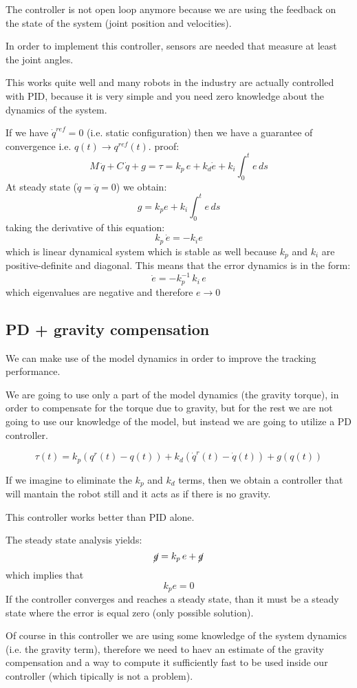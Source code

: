 The controller is not open loop anymore because we are using the feedback on the state of the system (joint position and velocities).

In order to implement this controller, sensors are needed that measure at least the joint angles.

This works quite well and many robots in the industry are actually controlled with PID, because it is very simple and you need zero knowledge about the dynamics of the system.

If we have $\dot{q}^{ref} = 0$ (i.e. static configuration) then we have a guarantee of convergence i.e. $q(t) \to q^{ref}(t)$.
proof:
\[M\,\ddot{q} + C\,\dot{q} + g = \tau = k_p \, e + k_d \dot{e} + k_i \int_0^t e\,ds\]
At steady state ($\dot{q} = \ddot{q} = 0$) we obtain:
\[g = k_p e + k_i \int_0^t e\,ds\]
taking the derivative of this equation:
\[k_p\,\dot{e} = -k_i e\]
which is linear dynamical system which is stable as well because $k_p$ and $k_i$ are positive-definite and diagonal. This means that the error dynamics is in the form:
\[\dot{e} = -k_p^{-1}\,k_i\,e\]
which eigenvalues are negative and therefore $e\to 0$

\subsection{PD + gravity compensation}
We can make use of the model dynamics in order to improve the tracking performance.

We are going to use only a part of the model dynamics (the gravity torque), in order to compensate for the torque due to gravity, but for the rest we are not going to use our knowledge of the model, but instead we are going to utilize a PD controller.

\[\tau(t) = k_p (q^r(t) - q(t))  + k_d (\dot{q}^r(t) - \dot{q}(t)) + g(q(t))\]

If we imagine to eliminate the $k_p$ and $k_d$ terms, then we obtain a controller that will mantain the robot still and it acts as if there is no gravity.

This controller works better than PID alone.

The steady state analysis yields:
\[\cancel{g} = k_p\,e + \cancel{g}\]
which implies that 
\[k_p e = 0\]
If the controller converges and reaches a steady state, than it must be a steady state where the error is equal zero (only possible solution).

Of course in this controller we are using some knowledge of the system dynamics (i.e. the gravity term), therefore we need to haev an estimate of the gravity compensation and a way to compute it sufficiently fast to be used inside our controller (which tipically is not a problem).

